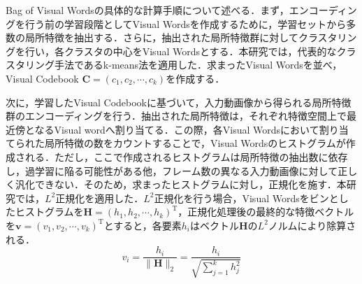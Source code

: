 Bag of Visual Wordsの具体的な計算手順について述べる．まず，エンコーディングを行う前の学習段階としてVisual Wordsを作成するために，学習セットから多数の局所特徴を抽出する．さらに，抽出された局所特徴群に対してクラスタリングを行い，各クラスタの中心をVisual Wordsとする．本研究では，代表的なクラスタリング手法であるk-means法を適用した．求まったVisual Wordsを並べ，Visual Codebook $ \bm{C} = (c_1, c_2, \cdots, c_k) $を作成する．

次に，学習したVisual Codebookに基づいて，入力動画像から得られる局所特徴群のエンコーディングを行う．抽出された局所特徴は，それぞれ特徴空間上で最近傍となるVisual wordへ割り当てる．この際，各Visual Wordsにおいて割り当てられた局所特徴の数をカウントすることで，Visual Wordsのヒストグラムが作成される．ただし，ここで作成されるヒストグラムは局所特徴の抽出数に依存し，過学習に陥る可能性がある他，フレーム数の異なる入力動画像に対して正しく汎化できない．そのため，求まったヒストグラムに対し，正規化を施す．本研究では，$ L^2 $正規化を適用した．$ L^2 $正規化を行う場合，Visual Wordsをビンとしたヒストグラムを$ \bm{H} =  (h_1, h_2, \cdots, h_k)^{\mathrm{T}} $，正規化処理後の最終的な特徴ベクトルを$ \bm{v} =  (v_1, v_2, \cdots, v_k)^{\mathrm{T}}　$とすると，各要素$ h_i $はベクトル$ \bm{H} $の$ L^2 $ノルムにより除算される．
%
\begin{equation}
{ v_i = \frac{h_i}{\lVert{\bm{H}}\rVert_2} = \frac{h_i}{ \sqrt{\sum_{j=1}^{k} h_j^2} } }
\end{equation}

